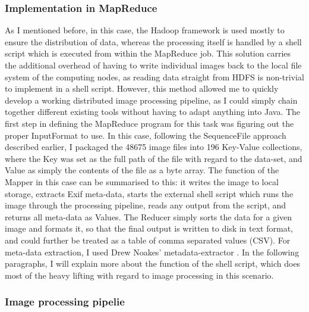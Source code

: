 \documentclass [12pt,a4paper]{report}
\begin{document}

\subsubsection{Implementation in MapReduce}

As I mentioned before, in this case, the Hadoop framework is used mostly to ensure the distribution of data, whereas the processing itself is handled by a shell script which is executed from within the MapReduce job. This solution carries the additional overhead of having to write individual images back to the local file system of the computing nodes, as reading data straight from HDFS is non-trivial to implement in a shell script. However, this method allowed me to quickly develop a working distributed image processing pipeline, as I could simply chain together different existing tools without having to adapt anything into Java.
The first step in defining the MapReduce program for this task was figuring out the proper InputFormat to use. In this case, following the SequenceFile approach described earlier, I packaged the 48675 image files into 196 Key-Value collections, where the Key was set as the full path of the file with regard to the data-set, and Value as simply the contents of the file as a byte array.
The function of the Mapper in this case can be summarised to this: it writes the image to local storage, extracts Exif meta-data, starts the external shell script which runs the image through the processing pipeline, reads any output from the script, and returns all meta-data as Values. The Reducer simply sorts the data for a given image and formats it, so that the final output is written to disk in text format, and could further be treated as a table of comma separated values (CSV). For meta-data extraction, I used Drew Noakes' metadata-extractor \cite{metadataextractor}. In the following paragraphs, I will explain more about the function of the shell script, which does most of the heavy lifting with regard to image processing in this scenario.

\subsubsection{Image processing pipelie}
\end{document}
